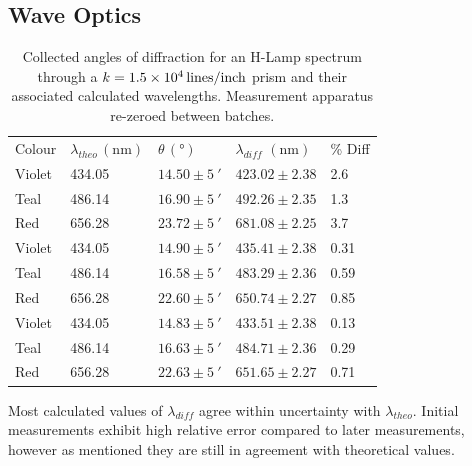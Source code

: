 \documentclass[10pt, twocolumn]{article}
\theoremstyle{definition}
\begin{document}
\subsection{Wave Optics}
\begin{table}[ht!]
  \centering%
  \caption{Collected angles of diffraction for an H-Lamp spectrum through a $k=\qty{1.5d4}{lines\per inch}$ prism and their associated calculated wavelengths. Measurement apparatus re-zeroed between batches.\\}
  \begin{tabular}{lllll}
    \toprule
    Colour & $\lambda_{theo}\, (\unit{\nano\meter})$ & $\theta\, (\unit{\degree})$   & $\lambda_{diff}$ $(\unit{\nano\meter})$ & \% Diff \\
    Violet & 434.05                                  & $14.50\pm\qty{5}{\arcminute}$ & $423.02\pm2.38$                         & 2.6     \\
    Teal   & 486.14                                  & $16.90\pm\qty{5}{\arcminute}$ & $492.26\pm2.35$                         & 1.3     \\
    Red    & 656.28                                  & $23.72\pm\qty{5}{\arcminute}$ & $681.08\pm2.25$                         & 3.7     \\
    \midrule
    Violet & 434.05                                  & $14.90\pm\qty{5}{\arcminute}$ & $435.41\pm2.38$                         & 0.31    \\
    Teal   & 486.14                                  & $16.58\pm\qty{5}{\arcminute}$ & $483.29\pm2.36$                         & 0.59    \\
    Red    & 656.28                                  & $22.60\pm\qty{5}{\arcminute}$ & $650.74\pm2.27$                         & 0.85    \\
    \midrule
    Violet & 434.05                                  & $14.83\pm\qty{5}{\arcminute}$ & $433.51\pm2.38$                         & 0.13    \\
    Teal   & 486.14                                  & $16.63\pm\qty{5}{\arcminute}$ & $484.71\pm2.36$                         & 0.29    \\
    Red    & 656.28                                  & $22.63\pm\qty{5}{\arcminute}$ & $651.65\pm2.27$                         & 0.71    \\
    \bottomrule
  \end{tabular}
\end{table}
Most calculated values of $\lambda_{diff}$ agree within uncertainty with $\lambda_{theo}$. Initial measurements exhibit high relative error compared to later measurements, however
as mentioned they are still in agreement with theoretical values.
\end{document}
